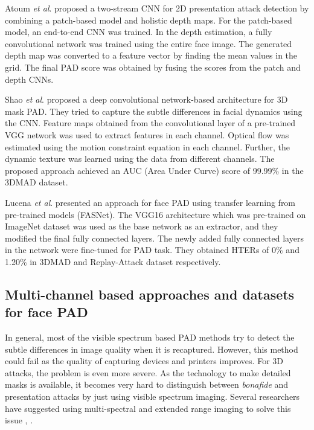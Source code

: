 \documentclass[journal]{IEEEtran}
\begin{document}
Atoum \textit{et al}. \cite{atoum2017face} proposed a two-stream CNN for 2D presentation attack detection by combining a patch-based model and holistic depth maps.
For the patch-based model, an end-to-end CNN was trained. In the depth estimation, a fully convolutional network was trained using the entire face image. The generated depth map was converted to a feature vector by finding the mean values in the  grid. The final PAD score was obtained by fusing the scores from the patch and depth CNNs.

Shao \textit{et al}. \cite{shao2017deep} proposed a deep convolutional network-based architecture for 3D mask PAD. They tried to capture the subtle differences in facial dynamics using the CNN. Feature maps obtained from the convolutional layer of a pre-trained VGG \cite{Simonyan15} network was used to extract features in each channel. Optical flow was estimated using the motion constraint equation in each channel. Further, the dynamic texture was learned using the data from different channels. The proposed approach achieved an AUC (Area Under Curve) score of 99.99\% in the 3DMAD dataset.

Lucena \textit{et al}. \cite{lucena2017transfer} presented an approach for face PAD using transfer learning from pre-trained models (FASNet). The VGG16 \cite{Simonyan15} architecture which was pre-trained on ImageNet \cite{ILSVRC15} dataset was used as the base network as an extractor, and they modified the final fully connected layers. The newly added fully connected layers in the network were fine-tuned for PAD task. They obtained HTERs of 0\% and 1.20\% in 3DMAD and Replay-Attack dataset respectively.

\subsection{Multi-channel based approaches and datasets for face PAD}

In general, most of the visible spectrum based PAD methods try to detect the subtle differences in image quality when it is recaptured. However, this method could fail as the quality of capturing devices and printers improves. For 3D attacks, the problem is even more severe. As the technology to make detailed masks is available, it becomes very hard to distinguish between \textit{bonafide} and presentation attacks by just using visible spectrum imaging. Several researchers have suggested using multi-spectral and extended range imaging to solve this issue \cite{raghavendra2017extended}, \cite{steiner2016reliable}.
\end{document}
